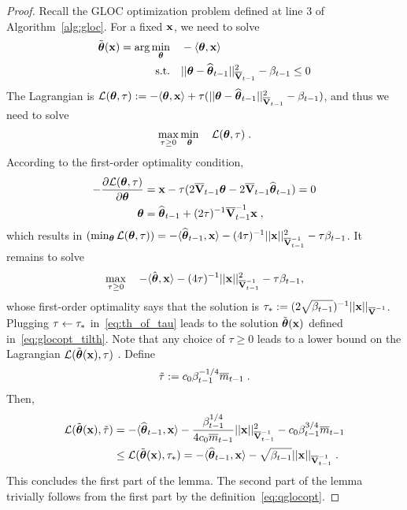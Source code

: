 \begin{proof}
  Recall the GLOC optimization problem defined at line 3 of Algorithm~\ref{alg:gloc}.
  For a fixed $\mathbf{x}$, we need to solve
  \begin{equation*}\begin{aligned}
    \tilde{\boldsymbol\theta}(\mathbf{x}) = \arg \min_{{{\boldsymbol \theta}}} &\quad -{\langle} {{\boldsymbol \theta}}, \mathbf{x} {\rangle} \\
    \mbox{s.t.}        &\quad || {{\boldsymbol \theta}} - \widehat{\boldsymbol\theta}_{t-1} ||^2_{\overline{\mathbf{V}}_{t-1}} - \beta_{t-1} \le 0
  \end{aligned}\end{equation*}
  The Lagrangian is $\mathcal{L}({{\boldsymbol \theta}},\tau) := -{\langle} {{\boldsymbol \theta}}, \mathbf{x} {\rangle} + \tau(|| {{\boldsymbol \theta}} - \widehat{\boldsymbol\theta}_{t-1} ||^2_{\overline{\mathbf{V}}_{t-1}} - \beta_{t-1})$, and thus we need to solve
  \[
  \max_{\tau \ge 0} \min_{{{\boldsymbol \theta}}} \quad \mathcal{L}({{\boldsymbol \theta}},\tau) \;.
  \]
  According to the first-order optimality condition,
  \begin{align}
    -{ \frac{\partial \mathcal{L}({{\boldsymbol \theta}},\tau)}{\partial {{\boldsymbol \theta}}} } &= \mathbf{x} - \tau(2\overline{\mathbf{V}}_{t-1} {{\boldsymbol \theta}} - 2\overline{\mathbf{V}}_{t-1} \widehat{\boldsymbol\theta}_{t-1}) = 0 \notag
  \\{{\boldsymbol \theta}} &= \widehat{\boldsymbol\theta}_{t-1} + (2\tau)^{-1} \overline{\mathbf{V}}^{-1}_{t-1}\mathbf{x} \;, \label{eq:th_of_tau}
  \end{align}
  which results in $ \left( \min_{{{\boldsymbol \theta}}} \mathcal{L}({{\boldsymbol \theta}},\tau) \right) = -{\langle} \widehat{\boldsymbol\theta}_{t-1}, \mathbf{x} {\rangle} - (4\tau)^{-1} || \mathbf{x} ||^2_{\overline{\mathbf{V}}^{-1}_{t-1}} - \tau \beta_{t-1}$.
  It remains to solve
  \[
  \max_{\tau\ge 0} \quad -{\langle} \hat{{{\boldsymbol \theta}}}, \mathbf{x} {\rangle} - (4\tau)^{-1} || \mathbf{x} ||^2_{\overline{\mathbf{V}}^{-1}_{t-1}} - \tau \beta_{t-1} ,
  \]
  whose first-order optimality says that the solution is $\tau_* := (2\sqrt{\beta_{t-1}})^{-1} ||\mathbf{x}||_{\overline{\mathbf{V}}^{-1}}$.
  Plugging $\tau \leftarrow \tau_*$ in~\eqref{eq:th_of_tau} leads to the solution $\tilde{\boldsymbol\theta}(\mathbf{x})$ defined in~\eqref{eq:glocopt_tilth}. %
  Note that any choice of $\tau \ge 0$ leads to a lower bound on the Lagrangian $\mathcal{L}(\tilde{\boldsymbol\theta}(\mathbf{x}),\tau)$ .
  Define 
  \begin{align*}
  \tilde\tau := c_0 \beta_{t-1}^{-1/4} \overline{m}_{t-1} \;.
  \end{align*}
  Then, 
  \begin{align*}
  \mathcal{L}(\tilde{\boldsymbol\theta}(\mathbf{x}), \tilde\tau) 
  &= -{\langle} \widehat{\boldsymbol\theta}_{t-1}, \mathbf{x} {\rangle} - { \frac{\beta_{t-1}^{1/4}}{4 c_0 \overline{m}_{t-1}} }  ||\mathbf{x}||^2_{\overline{\mathbf{V}}^{-1}_{t-1}}  - c_0 \beta_{t-1}^{3/4} \overline{m}_{t-1} \\
  &\le \mathcal{L}(\tilde{\boldsymbol\theta}(\mathbf{x}), \tau_*) = -{\langle} \widehat{\boldsymbol\theta}_{t-1}, \mathbf{x} {\rangle} - \sqrt{\beta_{t-1}} ||\mathbf{x}||_{\overline{\mathbf{V}}^{-1}_{t-1}} \;.
  \end{align*}
  This concludes the first part of the lemma.
  The second part of the lemma trivially follows from the first part by the definition~\eqref{eq:qglocopt}.
\end{proof}  

